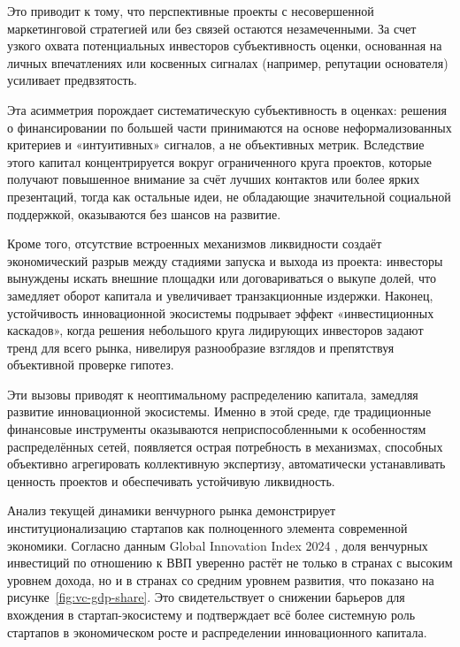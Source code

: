 \documentclass[
    14pt,
    specialist,
    candidate, %
    subf, %
    href,
    dotsinheaders=false
]{disser}
\begin{document}
Это приводит к тому, что перспективные проекты с несовершенной маркетинговой стратегией или без связей остаются незамеченными. За счет узкого охвата потенциальных инвесторов субъективность оценки, основанная на личных впечатлениях или косвенных сигналах (например, репутации основателя) усиливает предвзятость.

Эта асимметрия порождает систематическую субъективность в оценках: решения о финансировании по большей части принимаются на основе неформализованных критериев и «интуитивных» сигналов, а не объективных метрик. Вследствие этого капитал концентрируется вокруг ограниченного круга проектов, которые получают повышенное внимание за счёт лучших контактов или более ярких презентаций, тогда как остальные идеи, не обладающие значительной социальной поддержкой, оказываются без шансов на развитие.

Кроме того, отсутствие встроенных механизмов ликвидности создаёт экономический разрыв между стадиями запуска и выхода из проекта: инвесторы вынуждены искать внешние площадки или договариваться о выкупе долей, что замедляет оборот капитала и увеличивает транзакционные издержки. Наконец, устойчивость инновационной экосистемы подрывает эффект «инвестиционных каскадов», когда решения небольшого круга лидирующих инвесторов задают тренд для всего рынка, нивелируя разнообразие взглядов и препятствуя объективной проверке гипотез.

Эти вызовы приводят к неоптимальному распределению капитала, замедляя развитие инновационной экосистемы. Именно в этой среде, где традиционные финансовые инструменты оказываются неприспособленными к особенностям распределённых сетей, появляется острая потребность в механизмах, способных объективно агрегировать коллективную экспертизу, автоматически устанавливать ценность проектов и обеспечивать устойчивую ликвидность.

Анализ текущей динамики венчурного рынка демонстрирует институционализацию стартапов как полноценного элемента современной экономики. Согласно данным Global Innovation Index 2024 \cite{gii2024}, доля венчурных инвестиций по отношению к ВВП уверенно растёт не только в странах с высоким уровнем дохода, но и в странах со средним уровнем развития, что показано на рисунке~\ref{fig:vc-gdp-share}. Это свидетельствует о снижении барьеров для вхождения в стартап-экосистему и подтверждает всё более системную роль стартапов в экономическом росте и распределении инновационного капитала.
\end{document}
